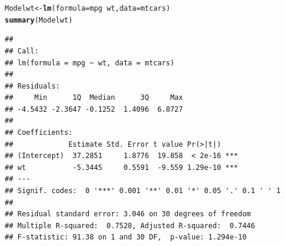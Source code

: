 \documentclass{article}\usepackage[]{graphicx}\usepackage[]{xcolor}
\makeatletter
\newcommand{\hlopt}[1]{\textcolor[rgb]{0,0,0}{#1}}%
\newcommand{\hlstd}[1]{\textcolor[rgb]{0.345,0.345,0.345}{#1}}%
\newcommand{\hlkwb}[1]{\textcolor[rgb]{0.69,0.353,0.396}{#1}}%
\newcommand{\hlkwc}[1]{\textcolor[rgb]{0.333,0.667,0.333}{#1}}%
\newcommand{\hlkwd}[1]{\textcolor[rgb]{0.737,0.353,0.396}{\textbf{#1}}}%
\newenvironment{kframe}{%
 \def\at@end@of@kframe{}%
 \ifinner\ifhmode%
  \def\at@end@of@kframe{\end{minipage}}%
  \begin{minipage}{\columnwidth}%
 \fi\fi%
 \def\FrameCommand##1{\hskip\@totalleftmargin \hskip-\fboxsep
 \colorbox{shadecolor}{##1}\hskip-\fboxsep
     \hskip-\linewidth \hskip-\@totalleftmargin \hskip\columnwidth}%
 \MakeFramed {\advance\hsize-\width
   \@totalleftmargin\z@ \linewidth\hsize
   \@setminipage}}%
 {\par\unskip\endMakeFramed%
 \at@end@of@kframe}
\newenvironment{knitrout}{}{} %
\makeatother
\begin{document}
\begin{knitrout}\scriptsize
{}\color{fgcolor}\begin{kframe}
\begin{alltt}
\hlstd{Modelwt} \hlkwb{<-} \hlkwd{lm}\hlstd{(}\hlkwc{formula} \hlstd{= mpg} \hlopt{~} \hlstd{wt,} \hlkwc{data} \hlstd{= mtcars)}
\hlkwd{summary}\hlstd{(Modelwt)}
\end{alltt}
\begin{verbatim}
## 
## Call:
## lm(formula = mpg ~ wt, data = mtcars)
## 
## Residuals:
##     Min      1Q  Median      3Q     Max 
## -4.5432 -2.3647 -0.1252  1.4096  6.8727 
## 
## Coefficients:
##             Estimate Std. Error t value Pr(>|t|)    
## (Intercept)  37.2851     1.8776  19.858  < 2e-16 ***
## wt           -5.3445     0.5591  -9.559 1.29e-10 ***
## ---
## Signif. codes:  0 '***' 0.001 '**' 0.01 '*' 0.05 '.' 0.1 ' ' 1
## 
## Residual standard error: 3.046 on 30 degrees of freedom
## Multiple R-squared:  0.7528,	Adjusted R-squared:  0.7446 
## F-statistic: 91.38 on 1 and 30 DF,  p-value: 1.294e-10
\end{verbatim}
\end{kframe}
\end{knitrout}
\end{document}
